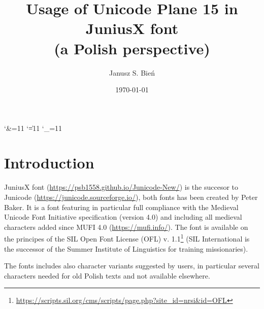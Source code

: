 \documentclass{article}
\begin{document}
\title{Usage of Unicode Plane 15 in JuniusX font\\ (a Polish perspective)}

\author{Janusz S. Bień}

\date{\today}

\maketitle

\catcode`\&=11
\catcode`\|=11
\catcode`\_=11






\section{Introduction}
\label{sec:introduction}



JuniusX font (\url{https://psb1558.github.io/Junicode-New/}) is the
succesor to Junicode (\url{https://junicode.sourceforge.io/}), both
fonts has been created by Peter Baker. It is a font featuring in
particular full compliance with the Medieval Unicode Font Initiative
specification (version 4.0) and including all medieval characters
added since MUFI 4.0 (\url{https://mufi.info/}). The font is available
on the principes of the SIL Open Font License (OFL)
v. 1.1\footnote{\url{https://scripts.sil.org/cms/scripts/page.php?site_id=nrsi&id=OFL}}
(SIL International is the successor of the Summer Institute of
  Linguistics for training missionaries).

  The fonts includes also character variants suggested by users, in
  particular several characters needed for old Polish texts and not
  available elsewhere.
  
\end{document}
